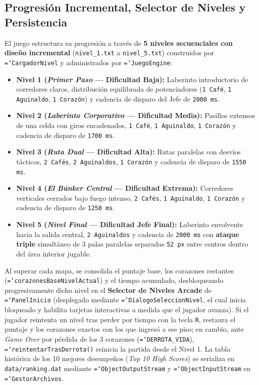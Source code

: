 \documentclass[12pt, a4paper]{article}
\DeclareRobustCommand{\code}[1]{\textcolor{codegreen}{\texttt{\hyphenchar\font=`\-#1}}}
\begin{document}
\subsection{Progresión Incremental, Selector de Niveles y Persistencia}
El juego estructura su progresión a través de \textbf{5 niveles secuenciales con diseño incremental} (\texttt{nivel\_1.txt} a \texttt{nivel\_5.txt}) construidos por \code{CargadorNivel} y administrados por \code{JuegoEngine}:
\begin{itemize}[leftmargin=1.27cm]
    \item \textbf{Nivel 1 (\textit{Primer Paso} — Dificultad Baja):} Laberinto introductorio de corredores claros, distribución equilibrada de potenciadores (\texttt{1 Café}, \texttt{1 Aguinaldo}, \texttt{1 Corazón}) y cadencia de disparo del Jefe de \texttt{2000 ms}.
    \item \textbf{Nivel 2 (\textit{Laberinto Corporativo} — Dificultad Media):} Pasillos extensos de una celda con giros encadenados, \texttt{1 Café}, \texttt{1 Aguinaldo}, \texttt{1 Corazón} y cadencia de disparo de \texttt{1700 ms}.
    \item \textbf{Nivel 3 (\textit{Ruta Dual} — Dificultad Alta):} Rutas paralelas con desvíos tácticos, \texttt{2 Cafés}, \texttt{2 Aguinaldos}, \texttt{1 Corazón} y cadencia de disparo de \texttt{1550 ms}.
    \item \textbf{Nivel 4 (\textit{El Búnker Central} — Dificultad Extrema):} Corredores verticales cerrados bajo fuego intenso, \texttt{2 Cafés}, \texttt{1 Aguinaldo}, \texttt{1 Corazón} y cadencia de disparo de \texttt{1250 ms}.
    \item \textbf{Nivel 5 (\textit{Nivel Final} — Dificultad Jefe Final):} Laberinto envolvente hacia la salida central, \texttt{2 Aguinaldos} y cadencia de \texttt{2000 ms} con \textbf{ataque triple} simultáneo de 3 palas paralelas separadas \texttt{52 px} entre centros dentro del área interior jugable.
\end{itemize}

Al superar cada mapa, se consolida el puntaje base, los corazones restantes (\code{corazonesBaseNivelActual}) y el tiempo acumulado, desbloqueando progresivamente dicho nivel en el \textbf{Selector de Niveles Arcade} de \code{PanelInicio} (desplegado mediante \code{DialogoSeleccionNivel}, el cual inicia bloqueado y habilita tarjetas interactivas a medida que el jugador avanza). Si el jugador reintenta un nivel tras perder por tiempo con la tecla \texttt{R}, restaura el puntaje y los corazones exactos con los que ingresó a ese piso; en cambio, ante \textit{Game Over} por pérdida de los 3 corazones (\code{DERROTA\_VIDA}), \code{reintentarTrasDerrota()} reinicia la partida desde el Nivel 1. La tabla histórica de los 10 mejores desempeños (\textit{Top 10 High Scores}) se serializa en \texttt{data/ranking.dat} mediante \code{ObjectOutputStream} y \code{ObjectInputStream} en \code{GestorArchivos}.
\end{document}
